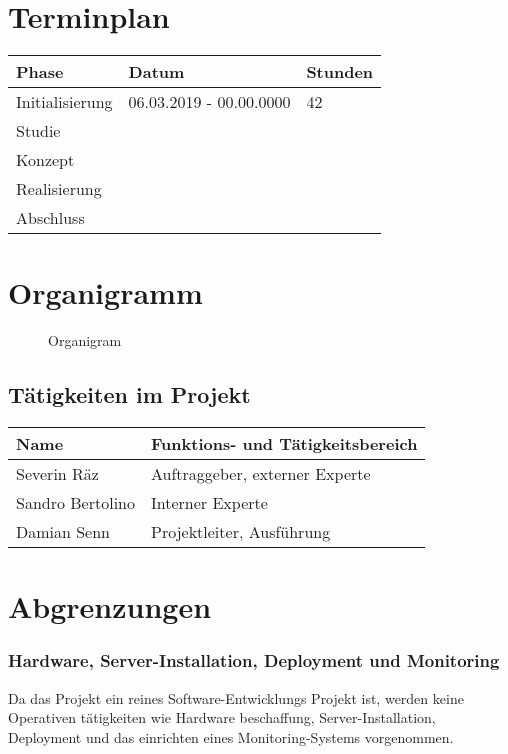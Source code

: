 \section{Terminplan}\label{terminplan}

\begin{longtable}[]{@{}lll@{}}
\toprule
Phase & Datum & Stunden\tabularnewline
\midrule
\endhead
Initialisierung & 06.03.2019 - 00.00.0000 & 42\tabularnewline
Studie & &\tabularnewline
Konzept & &\tabularnewline
Realisierung & &\tabularnewline
Abschluss & &\tabularnewline
\bottomrule
\end{longtable}

\section{Organigramm}\label{organigramm}

\begin{figure}
  \centering
  \def\svgwidth{\columnwidth}
  
  \caption{Organigram}
\end{figure}

\subsection{Tätigkeiten im Projekt}\label{tuxe4tigkeiten-im-projekt}

\begin{longtable}[]{@{}ll@{}}
\toprule
Name & Funktions- und Tätigkeitsbereich\tabularnewline
\midrule
\endhead
Severin Räz & Auftraggeber, externer Experte\tabularnewline
Sandro Bertolino & Interner Experte\tabularnewline
Damian Senn & Projektleiter, Ausführung\tabularnewline
\bottomrule
\end{longtable}

\section{Abgrenzungen}\label{abgrenzungen}

\subsubsection{Hardware, Server-Installation, Deployment und
Monitoring}\label{hardware-server-installation-deployment-und-monitoring}

Da das Projekt ein reines Software-Entwicklungs Projekt ist, werden
keine Operativen tätigkeiten wie Hardware beschaffung,
Server-Installation, Deployment und das einrichten eines
Monitoring-Systems vorgenommen.

